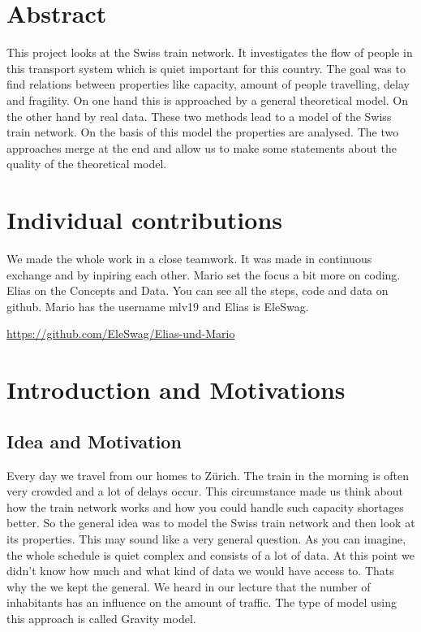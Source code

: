 \documentclass[11pt]{article}
\begin{document}
\section{Abstract}

This project looks at the Swiss train network. It investigates the flow of people in this transport system which is quiet important for this country. The goal was to find relations between properties like capacity, amount of people travelling, delay and fragility. On one hand this is approached  by a general theoretical model. On the other hand by real data. These two methods lead to a model of the Swiss train  network. On the basis of this model the properties are analysed. The two approaches merge at the end and allow us to make some statements about the quality of the theoretical model.
 

\section{Individual contributions}

We made the whole work in a close teamwork. It was made in continuous exchange and by inpiring each other. Mario set the focus a bit more on coding. Elias on the Concepts and Data. You can see all the steps, code and data on github. Mario has the username mlv19 and Elias is EleSwag.\newline

\url{https://github.com/EleSwag/Elias-und-Mario}

\section{Introduction and Motivations}

\subsection{Idea and Motivation}


Every day we travel from our homes to Z\"urich. The train in the morning is often very crowded and a lot of delays occur. This circumstance made us think about how the train network works and how you could handle such capacity shortages better. 
So the general idea was to model the Swiss train network and then look at its properties. This may sound like a very general question. As you can imagine, the whole schedule is quiet complex and consists of a lot of data. At this point we didn't know how much and what kind of data we would have access to. Thats why the we kept the general. We heard in our lecture that the number of inhabitants has an influence on the amount of traffic. The type of model using this approach is called Gravity model.
\end{document}
